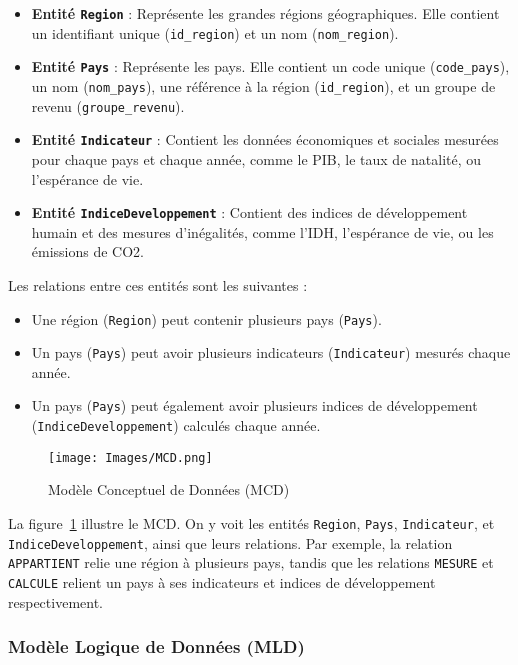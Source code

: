 \documentclass[11pt]{article}
\begin{document}
\begin{itemize}
  \item \textbf{Entité \texttt{Region}} : Représente les grandes régions géographiques. Elle contient un identifiant unique (\texttt{id\_region}) et un nom (\texttt{nom\_region}).
  \item \textbf{Entité \texttt{Pays}} : Représente les pays. Elle contient un code unique (\texttt{code\_pays}), un nom (\texttt{nom\_pays}), une référence à la région (\texttt{id\_region}), et un groupe de revenu (\texttt{groupe\_revenu}).
  \item \textbf{Entité \texttt{Indicateur}} : Contient les données économiques et sociales mesurées pour chaque pays et chaque année, comme le PIB, le taux de natalité, ou l'espérance de vie.
  \item \textbf{Entité \texttt{IndiceDeveloppement}} : Contient des indices de développement humain et des mesures d'inégalités, comme l'IDH, l'espérance de vie, ou les émissions de CO2.
\end{itemize}

Les relations entre ces entités sont les suivantes :
\begin{itemize}
  \item Une région (\texttt{Region}) peut contenir plusieurs pays (\texttt{Pays}).
  \item Un pays (\texttt{Pays}) peut avoir plusieurs indicateurs (\texttt{Indicateur}) mesurés chaque année.
  \item Un pays (\texttt{Pays}) peut également avoir plusieurs indices de développement (\texttt{IndiceDeveloppement}) calculés chaque année.
\end{itemize}

\begin{figure}[H]
    \centering
    \texttt{[image: Images/MCD.png]}
    \caption{Modèle Conceptuel de Données (MCD)}
    \label{fig:mcd}
\end{figure}

La figure~\ref{fig:mcd} illustre le MCD. On y voit les entités \texttt{Region}, \texttt{Pays}, \texttt{Indicateur}, et \texttt{IndiceDeveloppement}, ainsi que leurs relations. Par exemple, la relation \texttt{APPARTIENT} relie une région à plusieurs pays, tandis que les relations \texttt{MESURE} et \texttt{CALCULE} relient un pays à ses indicateurs et indices de développement respectivement.

\subsubsection*{Modèle Logique de Données (MLD)}
\end{document}
